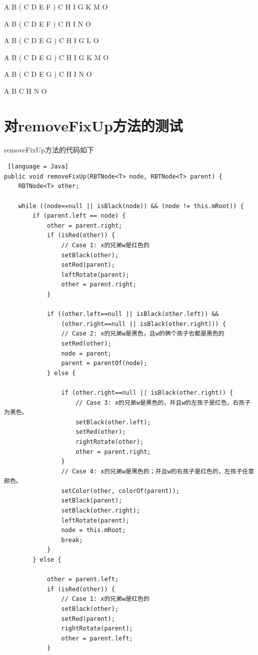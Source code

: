 \documentclass[12pt, a4paper, oneside]{ctexart}
\begin{document}
A B ( C D E F ) C H I G K M O

A B ( C D E F ) C H I N O

A B ( C D E G ) C H I G L O

A B ( C D E G ) C H I G K M O

A B ( C D E G ) C H I N O

A B C H N O

\section{对removeFixUp方法的测试}

removeFixUp方法的代码如下

\begin{lstlisting} [language = Java]
public void removeFixUp(RBTNode<T> node, RBTNode<T> parent) {
    RBTNode<T> other;

    while ((node==null || isBlack(node)) && (node != this.mRoot)) {
        if (parent.left == node) {
            other = parent.right;
            if (isRed(other)) {
                // Case 1: x的兄弟w是红色的  
                setBlack(other);
                setRed(parent);
                leftRotate(parent);
                other = parent.right;
            }

            if ((other.left==null || isBlack(other.left)) &&
                (other.right==null || isBlack(other.right))) {
                // Case 2: x的兄弟w是黑色，且w的俩个孩子也都是黑色的  
                setRed(other);
                node = parent;
                parent = parentOf(node);
            } else {

                if (other.right==null || isBlack(other.right)) {
                    // Case 3: x的兄弟w是黑色的，并且w的左孩子是红色，右孩子为黑色。  
                    setBlack(other.left);
                    setRed(other);
                    rightRotate(other);
                    other = parent.right;
                }
                // Case 4: x的兄弟w是黑色的；并且w的右孩子是红色的，左孩子任意颜色。
                setColor(other, colorOf(parent));
                setBlack(parent);
                setBlack(other.right);
                leftRotate(parent);
                node = this.mRoot;
                break;
            }
        } else {

            other = parent.left;
            if (isRed(other)) {
                // Case 1: x的兄弟w是红色的  
                setBlack(other);
                setRed(parent);
                rightRotate(parent);
                other = parent.left;
            }


\end{lstlisting}
\end{document}
